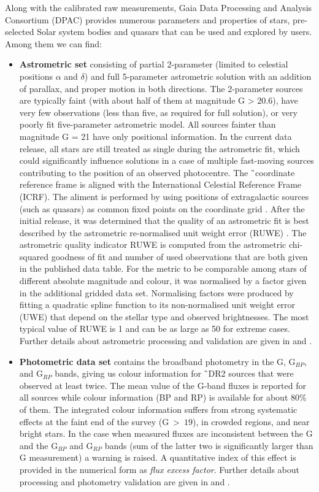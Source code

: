 Along with the calibrated raw measurements, Gaia Data Processing and Analysis Consortium (DPAC) provides numerous parameters and properties of stars, pre-selected Solar system bodies and quasars that can be used and explored by users. Among them we can find:
\begin{itemize}
	\item \textbf{Astrometric set} consisting of partial 2-parameter (limited to celestial positions $\alpha$ and $\delta$) and full 5-parameter astrometric solution with an addition of parallax, and proper motion in both directions. The 2-parameter sources are typically faint (with about half of them at magnitude G > 20.6), have very few observations (less than five, as required for full solution), or very poorly fit five-parameter astrometric model. All sources fainter than magnitude G = 21 have only positional information. In the current data release, all stars are still treated as single during the astrometric fit, which could significantly influence solutions in a case of multiple fast-moving sources contributing to the position of an observed photocentre. The \G\ coordinate reference frame is aligned with the International Celestial Reference Frame (ICRF). The aliment is performed by using positions of extragalactic sources (such as quasars) as common fixed points on the coordinate grid \cite{2018A&A...616A..14G}. After the initial release, it was determined that the quality of an astrometric fit is best described by the astrometric re-normalised unit weight error (RUWE) \cite{ruwe}. The astrometric quality indicator RUWE is computed from the astrometric chi-squared goodness of fit and number of used observations that are both given in the published data table. For the metric to be comparable among stars of different absolute magnitude and colour, it was normalised by a factor given in the additional gridded data set. Normalising factors were produced by fitting a quadratic spline function to its non-normalised unit weight error (UWE) that depend on the stellar type and observed brightnesses. The most typical value of RUWE is 1 and can be as large as 50 for extreme cases. Further details about astrometric processing and validation are given in \citet{2018A&A...616A...2L} and \citet{2018A&A...616A...9L}.
	
	\item \textbf{Photometric data set} contains the broadband photometry in the G, G$_{BP}$, and G$_{RP}$ bands, giving us colour information for \G\ DR2 sources that were observed at least twice. The mean value of the G-band fluxes is reported for all sources while colour information (BP and RP) is available for about 80$\%$ of them.  The integrated colour information suffers from strong systematic effects at the faint end of the survey (G~>~$19$), in crowded regions, and near bright stars. In the case when measured fluxes are inconsistent between the G and the G$_{BP}$ and G$_{RP}$ bands (sum of the latter two is significantly larger than G measurement) a warning is raised. A quantitative index of this effect is provided in the numerical form as \textit{flux excess factor}. Further details about processing and photometry validation are given in \citet{2018arXiv180409368E} and \citet{2018A&A...616A...3R}.
	

\end{itemize}
